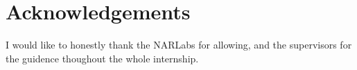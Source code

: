 
\cleardoublepage
\phantom{a}
\vfill

\section*{Acknowledgements}
I would like to honestly thank the NARLabs for allowing, and the supervisors for the guidence thoughout the whole internship.

\cleardoublepage
\tableofcontents









\cleardoublepage
{}


\printbibliography

% 	 


